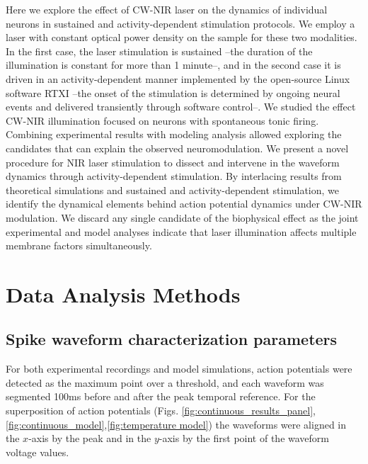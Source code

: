 Here we explore the effect of CW-NIR laser on the dynamics of individual neurons in sustained and activity-dependent stimulation protocols. We employ a laser with constant optical power density on the sample for these two modalities. In the first case, the laser stimulation is sustained --the duration of the illumination is constant for more than 1 minute--, and in the second case it is driven in an activity-dependent manner implemented by the open-source Linux software RTXI\parencite{patel_hard_2017} --the onset of the stimulation is determined by ongoing neural events and delivered transiently through software control--.
We studied the effect CW-NIR illumination focused on neurons with spontaneous tonic firing. Combining experimental results with modeling analysis allowed exploring the candidates that can explain the observed neuromodulation. We present a novel procedure for NIR laser stimulation to dissect and intervene in the waveform dynamics through activity-dependent stimulation. By interlacing results from theoretical simulations and sustained and activity-dependent stimulation, we identify the dynamical elements behind action potential dynamics under CW-NIR modulation. We discard any single candidate of the biophysical effect as the joint experimental and model analyses indicate that laser illumination affects multiple membrane factors simultaneously.




\section{Data Analysis Methods}

\subsection{Spike waveform characterization parameters} \label{sec:characterization parameters}
\label{sect:metrics}
For both experimental recordings and model simulations, action potentials were detected as the maximum point over a threshold, and each waveform was segmented 100ms before and after the peak temporal reference. For the superposition of action potentials (Figs. \ref{fig:continuous_results_panel},\ref{fig:continuous_model},\ref{fig:temperature model}) the waveforms were aligned in the $x$-axis by the peak and in the $y$-axis by the first point of the waveform voltage values.

